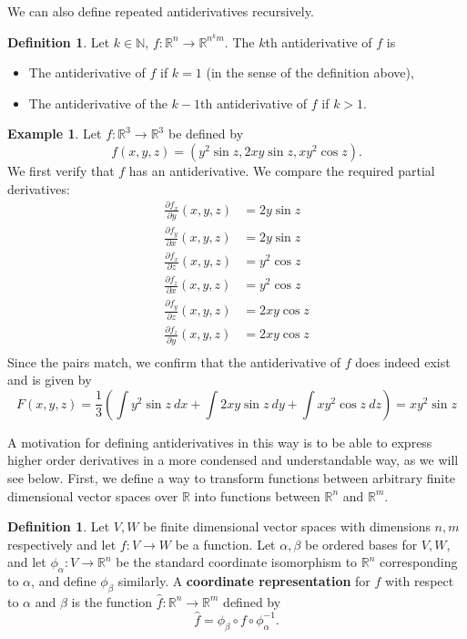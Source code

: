 \documentclass{article}
\theoremstyle{plain} %
\numberwithin{thm}{section} %
\theoremstyle{definition}
\newtheorem{defn}[thm]{Definition}
\newtheorem{example}[thm]{Example}
\begin{document}
    We can also define repeated antiderivatives recursively.
    \begin{defn}
        Let \(k \in \mathbb{N}\), \(f: \mathbb{R}^n \to \mathbb{R}^{n^km}\). The \(k\)th antiderivative of \(f\) is
        \begin{itemize}
            \item The antiderivative of \(f\) if \(k = 1\) (in the sense of the definition above),
            \item The antiderivative of the \(k-1\)th antiderivative of \(f\) if \(k > 1\).
        \end{itemize}
    \end{defn}
    \begin{example}
        Let \(f: \mathbb{R}^3 \to \mathbb{R}^3\) be defined by
        \[
            f(x,y,z) = (y^2 \sin z,2xy \sin z,xy^2 \cos z).
        \]
        We first verify that \(f\) has an antiderivative. We compare the required partial derivatives:
        \begin{align*}
            \frac{\partial f_x}{\partial y} (x,y,z) &= 2y\sin z \\
            \frac{\partial f_y}{\partial x} (x,y,z) &= 2y\sin z \\
            \frac{\partial f_x}{\partial z} (x,y,z) &= y^2 \cos z \\
            \frac{\partial f_z}{\partial x} (x,y,z) &= y^2 \cos z \\
            \frac{\partial f_y}{\partial z} (x,y,z) &= 2xy \cos z \\
            \frac{\partial f_z}{\partial y} (x,y,z) &= 2xy \cos z \\
        \end{align*}
        Since the pairs match, we confirm that the antiderivative of \(f\) does indeed exist and is given by
        \[
            F(x,y,z) = \frac{1}{3}\left(\int y^2 \sin z\ dx + \int 2xy \sin z\ dy + \int xy^2 \cos z\ dz\right) = xy^2 \sin z
        \]
    \end{example}
    A motivation for defining antiderivatives in this way is to be able to express higher order derivatives in a more condensed and understandable way, as we will see below. First, we define a way to transform functions between arbitrary finite dimensional vector spaces over \(\mathbb{R}\) into functions between \(\mathbb{R}^n\) and \(\mathbb{R}^m\).
    \begin{defn}
        Let \(V,W\) be finite dimensional vector spaces with dimensions \(n,m\) respectively and let \(f : V \to W\) be a function. Let \(\alpha ,\beta \) be ordered bases for \(V,W\), and let \(\phi _\alpha : V \to \mathbb{R}^n\) be the standard coordinate isomorphism to \(\mathbb{R}^n\) corresponding to \(\alpha\), and define \(\phi _\beta\) similarly. A \textbf{coordinate representation} for \(f\) with respect to \(\alpha\) and \(\beta\) is the function \(\hat{f}: \mathbb{R}^n \to \mathbb{R}^m\) defined by
        \[
            \hat{f} = \phi _\beta \circ f \circ \phi_\alpha^{-1}.
        \]
    \end{defn}
\end{document}
